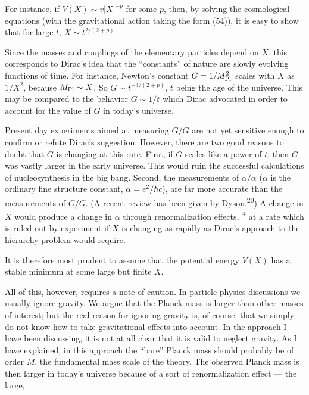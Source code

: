 For instance, if $V(X) \sim v |X|^{-p}$ for some $p$, then, by solving the
cosmological equations (with the gravitational action taking the form
(54)), it is easy to show that for large $t$, $X \sim t^{2/(2+p)}$.

Since the masses and couplings of the elementary particles
depend on $X$, this corresponds to Dirac's idea that the ``constants''
of nature are slowly evolving functions of time. For instance,
Newton's constant $G = 1/M_{\rm Pl}^2$ scales with $X$ as $1/X^2$, because $M_{\rm Pl} \sim X$.
So $G \sim t^{-4/(2+p)}$, $t$ being the age of the universe. This may be compared
to the behavior $G \sim 1/t$ which Dirac advocated in order to account
for the value of $G$ in today's universe.

Present day experiments aimed at measuring $\dot G/G$ are not yet
sensitive enough to confirm or refute Dirac's suggestion. However,
there are two good reasons to doubt that $G$ is changing at this rate.
First, if $G$ scales like a power of $t$, then $G$ was vastly larger in
the early universe. This would ruin the successful calculations of
nucleosynthesis in the big bang. Second, the measurements of $\dot \alpha/\alpha$
($\alpha$ is the ordinary fine structure constant, $\alpha = e^2/\hbar c$), are far more
accurate than the measurements of $\dot G/G$. (A recent review has been
given by Dyson.\textsuperscript{20}) A change in $X$ would produce a change in $\alpha$ through
renormalization effects,\textsuperscript{14} at a rate which is ruled out by experiment
if $X$ is changing as rapidly as Dirac's approach to the hierarchy problem
would require.

It is therefore most prudent to assume that the potential energy
$V(X)$ has a stable minimum at some large but finite $X$.

All of this, however, requires a note of caution. In particle
physics discussions we usually ignore gravity. We argue that the
Planck mass is larger than other masses of interest; but the real
reason for ignoring gravity is, of course, that we simply do not know
how to take gravitational effects into account. In the approach I
have been discussing, it is not at all clear that it is valid to neglect
gravity. As I have explained, in this approach the ``bare''
Planck mass should probably be of order $M$, the fundamental mass scale
of the theory. The observed Planck mass is then larger in today's
universe because of a sort of renormalization effect --- the large,

